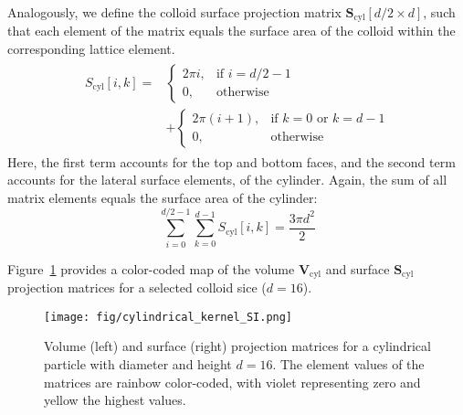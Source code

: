 \documentclass[10pt, a4paper]{article}
\begin{document}
\begin{multicols}{2}
Analogously, we define the colloid surface projection matrix $\mathbf{S}_{\text{cyl}}[d/2 \times d]$, such that each element of the matrix equals the surface area of the colloid within the corresponding lattice element.
\begin{align}
    \begin{split}
        S_{\text{cyl}}[i, k] = 
        &\begin{cases}
            2 \pi i,   & \text{if } i = d/2 - 1 \\
            0,         & \text{otherwise}
        \end{cases}
        \\
        &+
        \begin{cases}
            2 \pi (i + 1), & \text{if } k = 0 \text{ or } k = d - 1 \\
            0,             & \text{otherwise}
        \end{cases}
    \end{split}
\end{align}
Here, the first term accounts for the top and bottom faces, and the second term accounts for the lateral surface elements, of the cylinder.
Again, the sum of all matrix elements equals the surface area of the cylinder:
\begin{equation}
    \sum_{i=0}^{d/2 - 1} \sum_{k=0}^{d - 1} S_{\text{cyl}}[i, k] = \frac{3 \pi d^2}{2}
\end{equation}

Figure~\ref{fig:cylindrical_kernel_SI} provides a color-coded map of the volume $\mathbf{V}_{\text{cyl}}$ and surface $\mathbf{S}_{\text{cyl}}$ projection matrices for a selected colloid sice ($d = 16$).

\begin{figure}[H]
    \centering
    \texttt{[image: fig/cylindrical\_kernel\_SI.png]}
    \caption{
    Volume (left) and surface (right) projection matrices for a cylindrical particle with diameter and height $d = 16$. The element values of the matrices are rainbow color-coded, with violet representing zero and yellow the highest values.
    }
    \label{fig:cylindrical_kernel_SI}
\end{figure}


\end{multicols}
\end{document}
